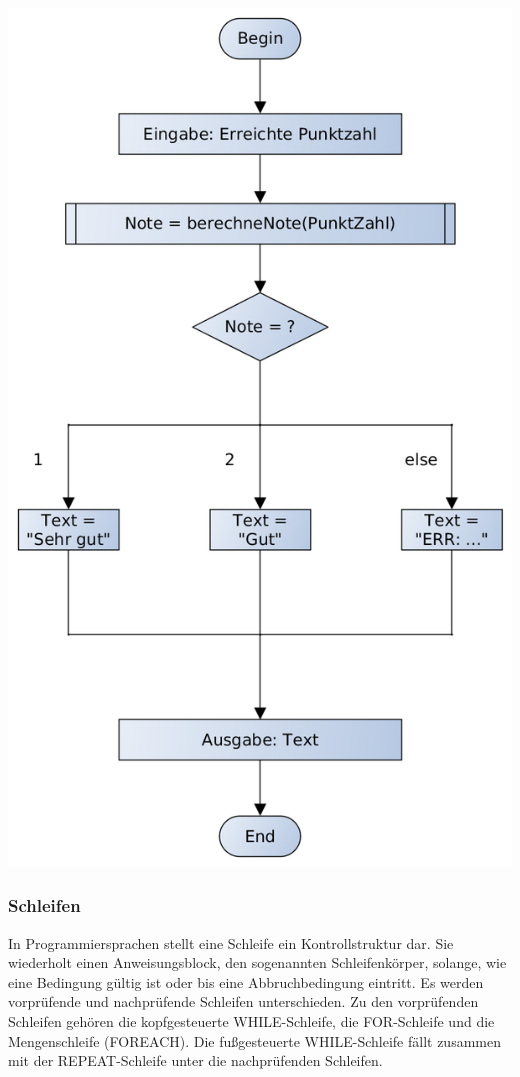 \includegraphics[scale=0.5]{pictures/lf06prog-pic/lf06prog-switch-case-pap.png}

\subsubsection{Schleifen}

In Programmiersprachen stellt eine Schleife ein Kontrollstruktur dar. Sie wiederholt einen Anweisungsblock, den sogenannten Schleifenkörper, solange, wie eine Bedingung gültig ist oder bis eine Abbruchbedingung eintritt. Es werden vorprüfende und nachprüfende Schleifen unterschieden. Zu den vorprüfenden Schleifen gehören die kopfgesteuerte WHILE-Schleife, die FOR-Schleife und die Mengenschleife (FOREACH). Die fußgesteuerte WHILE-Schleife fällt zusammen mit der REPEAT-Schleife unter die nachprüfenden Schleifen.


